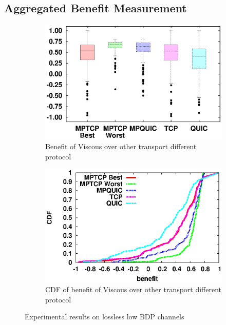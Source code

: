 \subsection{Aggregated Benefit Measurement}

\begin{figure}
	\captionsetup[subfigure]{}
	\begin{center}
		\begin{subfigure}{.49\linewidth}
			\includegraphics[width=.95\linewidth]{img/lowbdp-lossless/lowbdpnoloss_benefit.eps}
		 \caption{\label{fig:benefit-box} Benefit of Viscous over other transport different protocol}
		\end{subfigure}
		\begin{subfigure}{.49\linewidth}
			\includegraphics[width=.95\linewidth]{img/lowbdp-lossless/lowbdpnoloss_cdf.eps}				 
		 \caption{\label{fig:benefit-cdf} CDF of benefit of Viscous over other transport different protocol}
		\end{subfigure}
		\caption{\label{fig:benefit}Experimental results on lossless low BDP channels}
	\end{center}
\end{figure}

